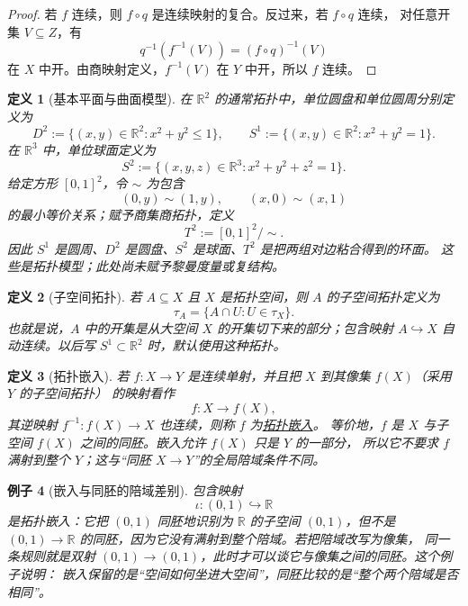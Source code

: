 \documentclass[UTF8,fontset=none,a4paper,11pt]{ctexart}
\theoremstyle{foundation-definition}
\newtheorem{definition}{定义}[section]
\theoremstyle{foundation-theorem}
\theoremstyle{foundation-proposition}
\theoremstyle{foundation-example}
\newtheorem{example}[definition]{例子}
\theoremstyle{foundation-remark}
\theoremstyle{foundation-theorem}
\newcommand{\term}[2]{\hyperref[#1]{#2}}
\begin{document}
\begin{proof}
若 \(f\) 连续，则 \(f\circ q\) 是连续映射的复合。反过来，若 \(f\circ q\) 连续，
对任意开集 \(V\subseteq Z\)，有
\[
q^{-1}(f^{-1}(V))=(f\circ q)^{-1}(V)
\]
在 \(X\) 中开。由商映射定义，\(f^{-1}(V)\) 在 \(Y\) 中开，所以 \(f\) 连续。
\end{proof}

\begin{definition}[基本平面与曲面模型]\label{def:basic-planar-models}
在 \(\mathbb R^2\) 的通常拓扑中，单位圆盘和单位圆周分别定义为
\[
D^2:=\{(x,y)\in\mathbb R^2:x^2+y^2\le1\},\qquad
S^1:=\{(x,y)\in\mathbb R^2:x^2+y^2=1\}.
\]
在 \(\mathbb R^3\) 中，单位球面定义为
\[
S^2:=\{(x,y,z)\in\mathbb R^3:x^2+y^2+z^2=1\}.
\]
给定方形 \([0,1]^2\)，令 \(\sim\) 为包含
\[
(0,y)\sim(1,y),\qquad (x,0)\sim(x,1)
\]
的最小等价关系；赋予商集商拓扑，定义
\[
T^2:=[0,1]^2/{\sim}.
\]
因此 \(S^1\) 是圆周、\(D^2\) 是圆盘、\(S^2\) 是球面、\(T^2\) 是把两组对边粘合得到的环面。
这些是拓扑模型；此处尚未赋予黎曼度量或复结构。
\end{definition}

\begin{definition}[子空间拓扑]\label{def:subspace-topology}
若 \(A\subseteq X\) 且 \(X\) 是拓扑空间，则 \(A\) 的子空间拓扑定义为
\[
\tau_A=\{A\cap U:U\in\tau_X\}.
\]
也就是说，\(A\) 中的开集是从大空间 \(X\) 的开集切下来的部分；包含映射
\(A\hookrightarrow X\) 自动连续。以后写 \(S^1\subset\mathbb R^2\) 时，默认使用这种拓扑。
\end{definition}

\begin{definition}[拓扑嵌入]\label{def:topological-embedding}
若 \(f:X\to Y\) 是连续单射，并且把 \(X\) 到其像集 \(f(X)\)（采用 \(Y\) 的子空间拓扑）
的映射看作
\[
f:X\longrightarrow f(X),
\]
其逆映射 \(f^{-1}:f(X)\to X\) 也连续，则称 \(f\) 为\term{def:topological-embedding}{拓扑嵌入}。
等价地，\(f\) 是 \(X\) 与子空间 \(f(X)\) 之间的同胚。嵌入允许 \(f(X)\) 只是 \(Y\) 的一部分，
所以它不要求 \(f\) 满射到整个 \(Y\)；这与“同胚 \(X\to Y\)”的全局陪域条件不同。
\end{definition}

\begin{example}[嵌入与同胚的陪域差别]\label{ex:embedding-homeomorphism-codomain}
包含映射
\[
\iota:(0,1)\hookrightarrow\mathbb R
\]
是拓扑嵌入：它把 \((0,1)\) 同胚地识别为 \(\mathbb R\) 的子空间 \((0,1)\)，但不是
\((0,1)\to\mathbb R\) 的同胚，因为它没有满射到整个陪域。若把陪域改写为像集，
同一条规则就是双射 \((0,1)\to(0,1)\)，此时才可以谈它与像集之间的同胚。这个例子说明：
嵌入保留的是“空间如何坐进大空间”，同胚比较的是“整个两个陪域是否相同”。
\end{example}
\end{document}
